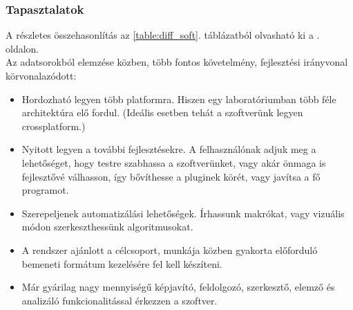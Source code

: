 \documentclass[a4paper,12pt,oneside]{report}
\begin{document}
\subsubsection{Tapasztalatok}
A részletes összehasonlítás az \ref{table:diff_soft}. táblázatból olvasható ki a \pageref{table:diff_soft}. oldalon.\\
Az adatsorokból elemzése közben, több fontos követelmény, fejlesztési irányvonal körvonalazódott:
\begin{itemize}
	\itemsep0em
	\item Hordozható legyen több platformra. Hiszen egy laboratóriumban több féle architektúra elő fordul. (Ideális esetben tehát a szoftverünk legyen crossplatform.)
	\item Nyitott legyen a további fejlesztésekre. A felhasználónak adjuk meg a lehetőséget, hogy testre szabhassa a szoftverünket, vagy akár önmaga is fejlesztővé válhasson, így bővíthesse a pluginek körét, vagy javítsa a fő programot.

	\item Szerepeljenek automatizálási lehetőségek. Írhassunk makrókat, vagy vizuális módon szerkeszthessünk algoritmusokat.
	\item A rendszer ajánlott a célcsoport, munkája közben gyakorta előforduló bemeneti formátum kezelésére fel kell készíteni.
	\item Már gyárilag nagy mennyiségű képjavító, feldolgozó, szerkesztő, elemző és analizáló funkcionalitással érkezzen a szoftver.

\end{itemize}
\end{document}
